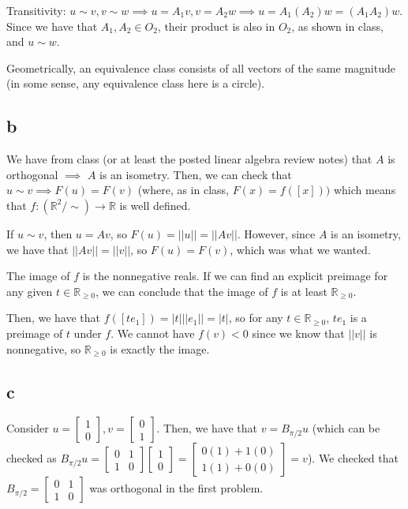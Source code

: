 \documentclass[12pt,letterpaper]{article}
\theoremstyle{definition}
\newcommand{\R}{\mathbb{R}}
\begin{document}
Transitivity: $u \sim v, v \sim w \implies u = A_1v, v = A_2w \implies u = A_1(A_2)w = (A_1A_2)w$. Since we have that $A_1, A_2 \in O_2$, their product is also in $O_2$, as shown in class, and $u \sim w$.

Geometrically, an equivalence class consists of all vectors of the same magnitude (in some sense, any equivalence class here is a circle).

\subsection*{b}

We have from class (or at least the posted linear algebra review notes) that $A$ is orthogonal $\implies$ $A$ is an isometry. Then, we can check that $u \sim v \implies F(u) = F(v)$ (where, as in class, $F(x) = f([x]))$ which means that $f: (\R^2 / \sim) \rightarrow \R$ is well defined.

If $u \sim v$, then $u = Av$, so $F(u) = ||u|| = ||Av||$. However, since $A$ is an isometry, we have that $||Av|| = ||v||$, so $F(u) = F(v)$, which was what we wanted. 

The image of $f$ is the nonnegative reals. If we can find an explicit preimage for any given $t \in \R_{\geq 0}$, we can conclude that the image of $f$ is at least $\R_{\geq 0}$.

Then, we have that $f([te_1]) = |t|||e_1|| = |t|$, so for any $t \in \R_{\geq 0}$, $te_1$ is a preimage of $t$ under $f$. We cannot have $f(v) < 0$ since we know that $||v||$ is nonnegative, so $\R_{\geq 0}$ is exactly the image.

\subsection*{c}

Consider $u = \begin{bmatrix} 1 \\ 0 \end{bmatrix}, v = \begin{bmatrix} 0 \\ 1 \end{bmatrix}$. Then, we have that $v = B_{\pi / 2}u$ (which can be checked as $B_{\pi / 2}u = \begin{bmatrix} 0 & 1 \\ 1 & 0\end{bmatrix}\begin{bmatrix} 1 \\ 0 \end{bmatrix} = \begin{bmatrix} 0(1) + 1(0) \\ 1(1) + 0(0) \end{bmatrix} = v$). We checked that $B_{\pi / 2} = \begin{bmatrix} 0 & 1 \\ 1 & 0\end{bmatrix}$ was orthogonal in the first problem.
\end{document}
